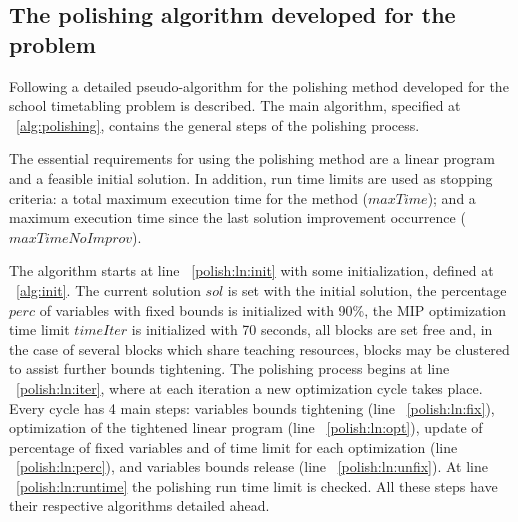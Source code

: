\subsection{The polishing algorithm developed for the problem}

Following a detailed pseudo-algorithm for the polishing method developed for the school timetabling problem is described. The main algorithm, specified at ~\ref{alg:polishing}, contains the general steps of the polishing process.

The essential requirements for using the polishing method are a linear program and a feasible initial solution. In addition, run time limits are used as stopping criteria: a total maximum execution time for the method ($maxTime$); and a maximum execution time since the last solution improvement occurrence ($maxTimeNoImprov$).

The algorithm starts at line ~\ref{polish:ln:init} with some initialization, defined at ~\ref{alg:init}. The current solution $sol$ is set with the initial solution, the percentage $perc$ of variables with fixed bounds is initialized with 90\%, the MIP optimization time limit $timeIter$ is initialized with 70 seconds, all blocks are set free and, in the case of several blocks which share teaching resources, blocks may be clustered to assist further bounds tightening. The polishing process begins at line ~\ref{polish:ln:iter}, where at each iteration a new optimization cycle takes place. Every cycle has 4 main steps: variables bounds tightening (line ~\ref{polish:ln:fix}), optimization of the tightened linear program (line ~\ref{polish:ln:opt}), update of percentage of fixed variables and of time limit for each optimization (line ~\ref{polish:ln:perc}), and variables bounds release (line ~\ref{polish:ln:unfix}). At line ~\ref{polish:ln:runtime} the polishing run time limit is checked. All these steps have their respective algorithms detailed ahead.

